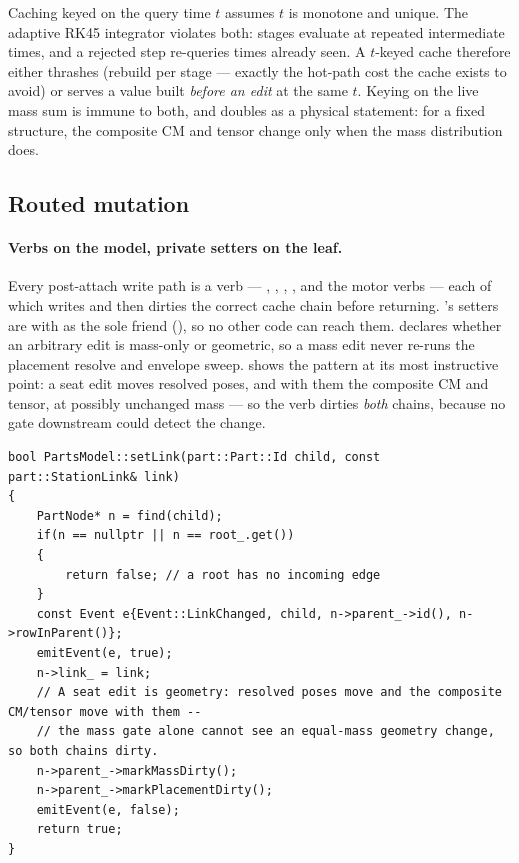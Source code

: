 \begin{rejected}
Caching keyed on the query time $t$ assumes $t$ is monotone and unique. The adaptive
RK45 integrator violates both: stages evaluate at repeated intermediate times, and a
rejected step re-queries times already seen. A $t$-keyed cache therefore either thrashes
(rebuild per stage --- exactly the hot-path cost the cache exists to avoid) or serves a
value built \emph{before an edit} at the same $t$. Keying on the live mass sum is immune
to both, and doubles as a physical statement: for a fixed structure, the composite CM and
tensor change only when the mass distribution does.
\end{rejected}

\subsection{Routed mutation}\label{sec:tradeoffs-routing}

\paragraph{Verbs on the model, private setters on the leaf.}
Every post-attach write path is a  verb --- ,
, , , and the motor verbs --- each of
which writes and then dirties the correct cache chain before returning. 's
setters are  with  as the sole friend
(), so no other code can reach them.
 declares whether an arbitrary edit is mass-only or geometric, so a mass
edit never re-runs the placement resolve and envelope sweep. 
shows the pattern at its most instructive point: a seat edit moves resolved poses, and
with them the composite CM and tensor, at possibly unchanged mass --- so the verb dirties
\emph{both} chains, because no gate downstream could detect the change.

\begin{listing}[htbp]
\begin{verbatim}
bool PartsModel::setLink(part::Part::Id child, const part::StationLink& link)
{
    PartNode* n = find(child);
    if(n == nullptr || n == root_.get())
    {
        return false; // a root has no incoming edge
    }
    const Event e{Event::LinkChanged, child, n->parent_->id(), n->rowInParent()};
    emitEvent(e, true);
    n->link_ = link;
    // A seat edit is geometry: resolved poses move and the composite CM/tensor move with them --
    // the mass gate alone cannot see an equal-mass geometry change, so both chains dirty.
    n->parent_->markMassDirty();
    n->parent_->markPlacementDirty();
    emitEvent(e, false);
    return true;
}
\end{verbatim}
\caption{A routed verb writes, then dirties the chains the write actually
invalidates ().}
\label{lst:tradeoffs-setlink}
\end{listing}

